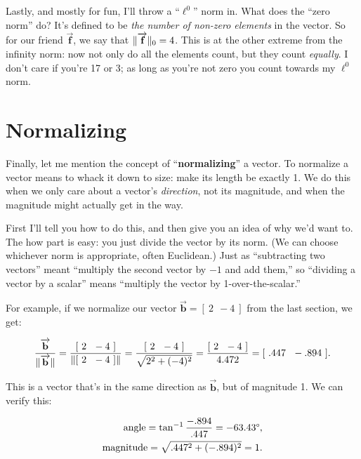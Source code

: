 Lastly, and mostly for fun, I'll throw a ``$\ell^0$'' norm in. What does the
``zero norm'' do? It's defined to be \textit{the number of non-zero elements}
in the vector. So for our friend $\overrightarrow{\textbf{f}}$, we say that
$\lVert\overrightarrow{\textbf{f}}\rVert_0 = 4$. This is at the other extreme from the
infinity norm: now not only do all the elements count, but they count
\textit{equally}. I don't care if you're 17 or 3; as long as you're not zero
you count towards my $\ell^0$ norm.

\section{Normalizing}

\label{normalizing}

Finally, let me mention the concept of ``\textbf{normalizing}'' a vector. To
normalize a vector means to whack it down to size: make its length be exactly
1. We do this when we only care about a vector's \textit{direction}, not its
magnitude, and when the magnitude might actually get in the way.

First I'll tell you how to do this, and then give you an idea of why we'd want
to. The how part is easy: you just divide the vector by its norm. (We can
choose whichever norm is appropriate, often Euclidean.) Just as ``subtracting
two vectors'' meant ``multiply the second vector by $-1$ and add them,'' so
``dividing a vector by a scalar'' means ``multiply the vector by
1-over-the-scalar.''

For example, if we normalize our vector $\overrightarrow{\textbf{b}} = [\ 2\ \
-4\ ]$ from the last section, we get:

\vspace{-.15in}
\begin{align*}
\frac{\overrightarrow{\textbf{b}}}{\lVert\overrightarrow{\textbf{b}}\rVert} =
\frac{[\ 2\ \ -4\ ]}{\lVert[\ 2\ \ -4\ ]\rVert} =
\frac{[\ 2\ \ -4\ ]}{\sqrt{2^2 + (-4)^2}} =
\frac{[\ 2\ \ -4\ ]}{4.472} = [\ .447 \ \ -.894\ ].
\end{align*}

This is a vector that's in the same direction as $\overrightarrow{\textbf{b}}$,
but of magnitude 1. We can verify this:

\vspace{-.15in}
\begin{align*}
\textrm{angle} = \tan^{-1} \frac{-.894}{.447} = -63.43\degree, \\
\textrm{magnitude} = \sqrt{.447^2 + (-.894)^2} = 1.
\end{align*}

